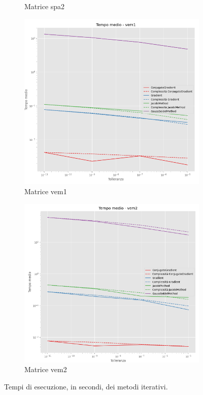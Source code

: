 \begin{figure}[!ht]
\begin{subfigure}{0.45\textwidth}
        \caption{Matrice spa2}
        \label{fig:time_spa2}
    \end{subfigure}
    \hfill
    \begin{subfigure}{0.45\textwidth}
        \centering
        \includegraphics[width=\textwidth]{./../report/Progetto_1_bis/img/time_vem1.png}
        \caption{Matrice vem1}
        \label{fig:time_vem1}
    \end{subfigure}
    \hfill
    \begin{subfigure}{0.45\textwidth}
        \centering
        \includegraphics[width=\textwidth]{./../report/Progetto_1_bis/img/time_vem2.png}
        \caption{Matrice vem2}
        \label{fig:time_vem2}
    \end{subfigure}
    \caption{Tempi di esecuzione, in secondi, dei metodi iterativi.}
    \label{fig:time}
\end{figure}

